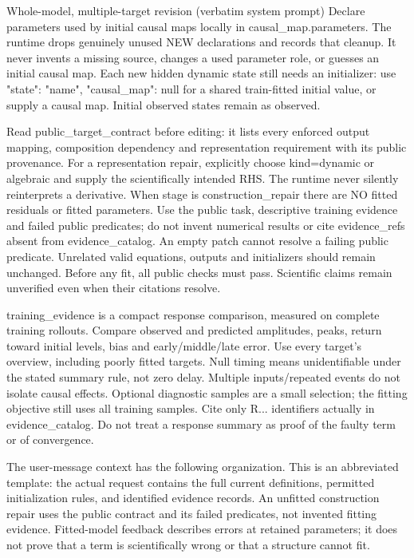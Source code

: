 \begin{afpromptbox}{Whole-model, multiple-target revision (verbatim system prompt)}
Declare parameters used by initial causal maps locally in
causal_map.parameters. The runtime drops genuinely unused NEW declarations
and records that cleanup. It never invents a missing source, changes a used
parameter role, or guesses an initial causal map. Each new hidden dynamic
state still needs an initializer: use {"state": "name", "causal_map": null}
for a shared train-fitted initial value, or supply a causal map. Initial
observed states remain as observed.

 Read public_target_contract before editing: it lists every enforced output
mapping, composition dependency and representation requirement with its
public provenance. For a representation repair, explicitly choose
kind=dynamic or algebraic and supply the scientifically intended RHS. The
runtime never silently reinterprets a derivative. When stage is
construction_repair there are NO fitted residuals or fitted parameters. Use
the public task, descriptive training evidence and failed public predicates;
do not invent numerical results or cite evidence_refs absent from
evidence_catalog. An empty patch cannot resolve a failing public predicate.
Unrelated valid equations, outputs and initializers should remain unchanged.
Before any fit, all public checks must pass. Scientific claims remain
unverified even when their citations resolve.

 training_evidence is a compact response comparison, measured on complete
training rollouts. Compare observed and predicted amplitudes, peaks, return
toward initial levels, bias and early/middle/late error. Use every target's
overview, including poorly fitted targets. Null timing means unidentifiable
under the stated summary rule, not zero delay. Multiple inputs/repeated
events do not isolate causal effects. Optional diagnostic samples are a
small selection; the fitting objective still uses all training samples. Cite
only R... identifiers actually in evidence_catalog. Do not treat a response
summary as proof of the faulty term or of convergence.
\end{afpromptbox}

The user-message context has the following organization. This is an abbreviated
template: the actual request contains the full current definitions, permitted
initialization rules, and identified evidence records. An unfitted construction
repair uses the public contract and its failed predicates, not invented fitting
evidence. Fitted-model feedback describes errors at retained parameters; it
does not prove that a term is scientifically wrong or that a structure cannot fit.

